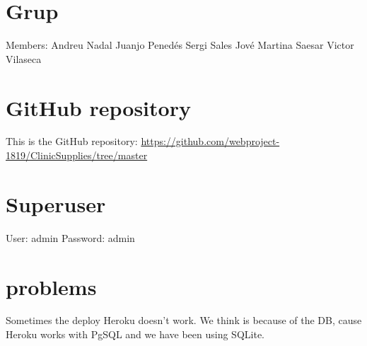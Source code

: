 \documentclass{article}
\begin{document}
\section{Grup}
Members:
Andreu Nadal
Juanjo Penedés
Sergi Sales Jové
Martina Saesar
Victor Vilaseca

\section{GitHub repository}
This is the GitHub repository: \href{https://github.com/webproject-1819/ClinicSupplies/tree/master}{https://github.com/webproject-1819/ClinicSupplies/tree/master}

\section{Superuser}
User: admin
Password: admin

\section{problems}
Sometimes the deploy Heroku doesn't work. We think is because of the DB, cause Heroku works with PgSQL and we have been using SQLite. 
\end{document}
